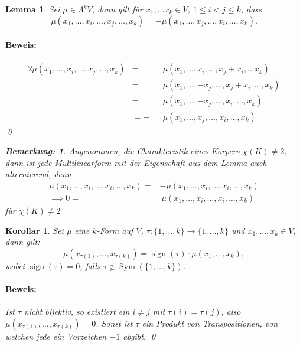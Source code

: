 \documentclass{report}
\DeclareMathOperator{\Sym}{Sym}
\DeclareMathOperator{\sign}{sign}
\theoremstyle{customrem}
\newtheorem*{bemerkung}{Bemerkung\textnormal:}
\theoremstyle{customdef}
\newtheorem{lemma}[definition]{Lemma}
\newtheorem{korrolar}[definition]{Korollar}
\renewenvironment{proof}{\paragraph{Beweis: }}{\qed}
\theoremstyle{customenv}
\begin{document}
	\begin{lemma}
		Sei \(\mu\in\Lambda^kV\), dann gilt für \(x_1,\ldots x_k\in V\), \(1\leq i<j\leq k\), dass \[\mu(x_1,\ldots, x_i,\ldots, x_j,\ldots, x_k) = -\mu(x_1,\ldots, x_j,\ldots, x_i,\ldots, x_k).\]
		\begin{proof}
			\begin{alignat*}{2}
				\mu(x_1,\ldots, x_i, \ldots, x_j, \ldots, x_k) 	&=  &&\mu(x_1, \ldots,  x_i, \ldots, x_j+x_i, \ldots x_k)\\
																&=  &&\mu(x_1, \ldots, -x_j, \ldots, x_j+x_i, \ldots, x_k)\\
																&=  &&\mu(x_1, \ldots, -x_j, \ldots, x_i, \ldots, x_k)\\
																&= -&&\mu(x_1, \ldots,  x_j, \ldots, x_i, \ldots, x_k)
			\end{alignat*}
		\end{proof}
		\begin{bemerkung}
			Angenommen, die \hyperref[lem142]{Charakteristik} eines Körpers \(\chi(K)\neq 2\), dann ist jede Multilinearform mit der Eigenschaft aus dem Lemma auch alternierend, denn
			\begin{align*}
				\mu(x_1, \ldots, x_i, \ldots, x_i, \ldots, x_k) =	& -\mu(x_1, \ldots, x_i, \ldots, x_i, \ldots, x_k)\\
														\implies 0=	&\  \mu(x_1, \ldots, x_i, \ldots, x_i, \ldots, x_k)
			\end{align*}
			für \(\chi(K)\neq 2\)
		\end{bemerkung}
	\end{lemma}
	
	\begin{korrolar}
		Sei \(\mu\) eine \(k\)-Form auf \(V\), \(\tau:\{1,\ldots, k\}\to\{1,\ldots, k\}\) und \(x_1,\ldots, x_k\in V\), dann gilt: \[\mu(x_{\tau(1)},\ldots, x_{\tau(k)}) = \sign(\tau)\cdot \mu(x_1,\ldots, x_k), \] wobei \(\sign(\tau)=0\), falls \(\tau\notin\Sym(\{1,\ldots, k\})\).
		\begin{proof}
			Ist \(\tau\) nicht bijektiv, so existiert ein \(i\neq j\) mit \(\tau(i)=\tau(j)\), also \(\mu(x_{\tau(1)},\ldots, x_{\tau(k)}) = 0\). Sonst ist \(\tau\) ein Produkt von Transpositionen, von welchen jede ein Vorzeichen \(-1\) abgibt.
		\end{proof}
	\end{korrolar}
	
\end{document}
